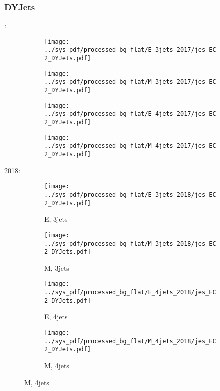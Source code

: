 \documentclass{beamer}
\begin{document}
\begin{frame}
\frametitle{DYJets}
\fontsize{5}{1}:
\begin{figure}
\centering
\begin{subfigure}[b]{0.24\textwidth}
\texttt{[image: ../sys\_pdf/processed\_bg\_flat/E\_3jets\_2017/jes\_EC2\_DYJets.pdf]}
\end{subfigure}
\begin{subfigure}[b]{0.24\textwidth}
\texttt{[image: ../sys\_pdf/processed\_bg\_flat/M\_3jets\_2017/jes\_EC2\_DYJets.pdf]}
\end{subfigure}
\begin{subfigure}[b]{0.24\textwidth}
\texttt{[image: ../sys\_pdf/processed\_bg\_flat/E\_4jets\_2017/jes\_EC2\_DYJets.pdf]}
\end{subfigure}
\begin{subfigure}[b]{0.24\textwidth}
\texttt{[image: ../sys\_pdf/processed\_bg\_flat/M\_4jets\_2017/jes\_EC2\_DYJets.pdf]}
\end{subfigure}
\end{figure}
2018:
\begin{figure}
\centering
\begin{subfigure}[b]{0.24\textwidth}
\texttt{[image: ../sys\_pdf/processed\_bg\_flat/E\_3jets\_2018/jes\_EC2\_DYJets.pdf]}
\captionsetup{font=tiny}
\caption{E, 3jets}
\end{subfigure}
\begin{subfigure}[b]{0.24\textwidth}
\texttt{[image: ../sys\_pdf/processed\_bg\_flat/M\_3jets\_2018/jes\_EC2\_DYJets.pdf]}
\captionsetup{font=tiny}
\caption{M, 3jets}
\end{subfigure}
\begin{subfigure}[b]{0.24\textwidth}
\texttt{[image: ../sys\_pdf/processed\_bg\_flat/E\_4jets\_2018/jes\_EC2\_DYJets.pdf]}
\captionsetup{font=tiny}
\caption{E, 4jets}
\end{subfigure}
\begin{subfigure}[b]{0.24\textwidth}
\texttt{[image: ../sys\_pdf/processed\_bg\_flat/M\_4jets\_2018/jes\_EC2\_DYJets.pdf]}
\captionsetup{font=tiny}
\caption{M, 4jets}
\end{subfigure}
\end{figure}
\end{frame}
\end{document}
